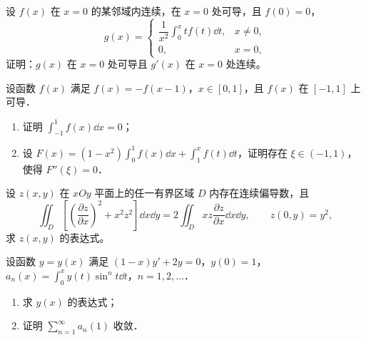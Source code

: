 \begin{question}[index=17,points=10]
设 $f(x)$ 在 $x=0$ 的某邻域内连续，在 $x=0$ 处可导，且 $f(0)=0$，
\[
g(x)=\begin{cases}
\dfrac1{x^2}\displaystyle\int_0^x tf(t)\dd t,&x\ne0,\\
0,&x=0,
\end{cases}
\]
证明：$g(x)$ 在 $x=0$ 处可导且 $g'(x)$ 在 $x=0$ 处连续。
\end{question}
\QuestionBreak\WorkSpace

\begin{question}[index=18,points=12]
设函数 $f(x)$ 满足 $f(x)=-f(x-1)$，$x\in[0,1]$，且 $f(x)$ 在 $[-1,1]$ 上可导．
\begin{enumerate}[label=（\arabic*）,leftmargin=2.5em,labelsep=.4em,itemsep=3pt,topsep=3pt]
\item 证明 $\displaystyle\int_{-1}^1 f(x)\dd x=0$；
\item 设 $\displaystyle F(x)=(1-x^2)\int_0^1 f(x)\dd x+\int_1^x f(t)\dd t$，证明存在 $\xi\in(-1,1)$，使得 $F''(\xi)=0$．
\end{enumerate}
\end{question}
\QuestionBreak\WorkSpace\WorkPageBreak

\begin{question}[index=19,points=12]
设 $z(x,y)$ 在 $xOy$ 平面上的任一有界区域 $D$ 内存在连续偏导数，且
\[
\iint_D\left[\left(\frac{\partial z}{\partial x}\right)^2+x^2z^2\right]\dd x\dd y
=2\iint_D xz\frac{\partial z}{\partial x}\dd x\dd y,\qquad z(0,y)=y^2,
\]
求 $z(x,y)$ 的表达式。
\end{question}
\QuestionBreak\WorkSpace

\begin{question}[index=20,points=12]
设函数 $y=y(x)$ 满足 $(1-x)y'+2y=0$，$y(0)=1$，$\displaystyle a_n(x)=\int_0^x y(t)\sin^n t\dd t$，$n=1,2,\ldots$．
\begin{enumerate}[label=（\arabic*）,leftmargin=2.5em,labelsep=.4em,itemsep=3pt,topsep=3pt]
\item 求 $y(x)$ 的表达式；
\item 证明 $\displaystyle\sum_{n=1}^{\infty}a_n(1)$ 收敛．
\end{enumerate}
\end{question}
\QuestionBreak\WorkSpace\WorkPageBreak

